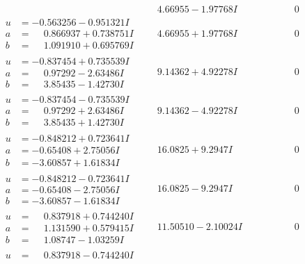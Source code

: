 \documentclass[1p]{elsarticle_modified}
\theoremstyle{definition}
\begin{document}
$$\begin{array}{c|c|c}
 & \phantom{-}4.66955 - 1.97768 I & \phantom{-0.000000 } 0 \\ \hline\begin{aligned}
u &= -0.563256 - 0.951321 I \\
a &= \phantom{-}0.866937 + 0.738751 I \\
b &= \phantom{-}1.091910 + 0.695769 I\end{aligned}
 & \phantom{-}4.66955 + 1.97768 I & \phantom{-0.000000 } 0 \\ \hline\begin{aligned}
u &= -0.837454 + 0.735539 I \\
a &= \phantom{-}0.97292 - 2.63486 I \\
b &= \phantom{-}3.85435 - 1.42730 I\end{aligned}
 & \phantom{-}9.14362 + 4.92278 I & \phantom{-0.000000 } 0 \\ \hline\begin{aligned}
u &= -0.837454 - 0.735539 I \\
a &= \phantom{-}0.97292 + 2.63486 I \\
b &= \phantom{-}3.85435 + 1.42730 I\end{aligned}
 & \phantom{-}9.14362 - 4.92278 I & \phantom{-0.000000 } 0 \\ \hline\begin{aligned}
u &= -0.848212 + 0.723641 I \\
a &= -0.65408 + 2.75056 I \\
b &= -3.60857 + 1.61834 I\end{aligned}
 & \phantom{-}16.0825 + 9.2947 I & \phantom{-0.000000 } 0 \\ \hline\begin{aligned}
u &= -0.848212 - 0.723641 I \\
a &= -0.65408 - 2.75056 I \\
b &= -3.60857 - 1.61834 I\end{aligned}
 & \phantom{-}16.0825 - 9.2947 I & \phantom{-0.000000 } 0 \\ \hline\begin{aligned}
u &= \phantom{-}0.837918 + 0.744240 I \\
a &= \phantom{-}1.131590 + 0.579415 I \\
b &= \phantom{-}1.08747 - 1.03259 I\end{aligned}
 & \phantom{-}11.50510 - 2.10024 I & \phantom{-0.000000 } 0 \\ \hline\begin{aligned}
u &= \phantom{-}0.837918 - 0.744240 I \\

\end{aligned}
\end{array}$$
\end{document}
